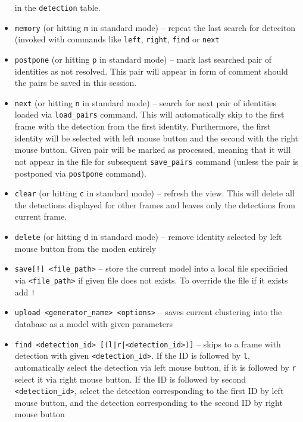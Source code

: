 \begin{itemize}
    in the \texttt{detection} table.
    \item \verb+memory+ (or hitting \verb+m+ in standard mode) -- repeat the last search 
    for deteciton (invoked with commands
    like \verb+left+, \verb+right+, \verb+find+ or \verb+next+
    \item \verb+postpone+ (or hitting \verb+p+ in standard mode) -- mark last searched 
    pair of identities as not resolved. This pair will appear in form of comment should
    the pairs be saved in this session.
    \item \verb+next+ (or hitting \verb+n+ in standard mode) -- search for next pair
    of identities loaded via \verb+load_pairs+ command. This will automatically skip
    to the first frame with the detection from the first identity. Furthermore, the
    first identity will be selected with left mouse button and the second with the
    right mouse button. Given pair will be marked as processed, meaning that it will
    not appear in the file for subsequent \verb+save_pairs+ command (unless the pair
    is postponed via \verb+postpone+ command).
    \item \verb+clear+ (or hitting \verb+c+ in standard mode) -- refresh the view.
    This will delete all the detections displayed for other frames and leaves only
    the detections from current frame.
    \item \verb+delete+ (or hitting \verb+d+ in standard mode) -- remove identity
    selected by left mouse button from the moden entirely
    \item \verb+save[!] <file_path>+ -- store the current model into a local file
    specificied via \verb+<file_path>+ if given file does not exists. To override the file if it exists add \verb+!+
    \item \verb+upload <generator_name> <options>+ -- saves current clustering into the
    database as a model with given parameters
    \item \verb+find <detection_id> [(l|r|<detection_id>)]+ -- skips to a frame
    with detection with given \verb+<detection_id>+. If the ID is followed by \verb+l+,
    automatically select the detection via left mouse button, if it is followed by
    \verb+r+ select it via right mouse button. If the ID is followed by second
    \verb+<detection_id>+, select the detection corresponding to the first ID by left
    mouse button, and the detection corresponding to the second ID by right mouse button

\end{itemize}
